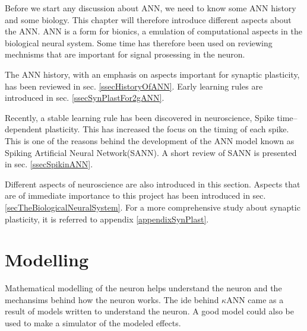 \documentclass[b5paper,11 pt]{report}
\begin{document}
	Before we start any discussion about ANN, we need to know some ANN history and some biology.
	This chapter will therefore introduce different aspects about the ANN.
	ANN is a form for bionics, a emulation of computational aspects in the biological neural system.
	Some time has therefore been used on reviewing mechnisms that are important for signal prosessing in the neuron.

	The ANN history, with an emphasis on aspects important for synaptic plasticity, has been reviewed in sec. \ref{ssecHistoryOfANN}.
	Early learning rules are introduced in sec. \ref{ssecSynPlastFor2gANN}. 

	Recently, a stable learning rule has been discovered in neuroscience, Spike time--dependent plasticity.
	This has increased the focus on the timing of each spike.
	This is one of the reasons behind the development of the ANN model known as Spiking Artificial Neural Network(SANN).
	A short review of SANN is presented in sec. \ref{ssecSpikinANN}.
	
	Different aspects of neuroscience are also introduced in this section.
	Aspects that are of immediate importance to this project has been introduced in sec. \ref{secTheBiologicalNeuralSystem}.
	For a more comprehensive study about synaptic plasticity, it is referred to appendix \ref{appendixSynPlast}.


	

	


\chapter{Modelling} 				%

	Mathematical modelling of the neuron helps understand the neuron and the mechansims behind how the neuron works.
	The ide behind $\kappa$ANN came as a result of models written to understand the neuron.
	A good model could also be used to make a simulator of the modeled effects. 
\end{document}
